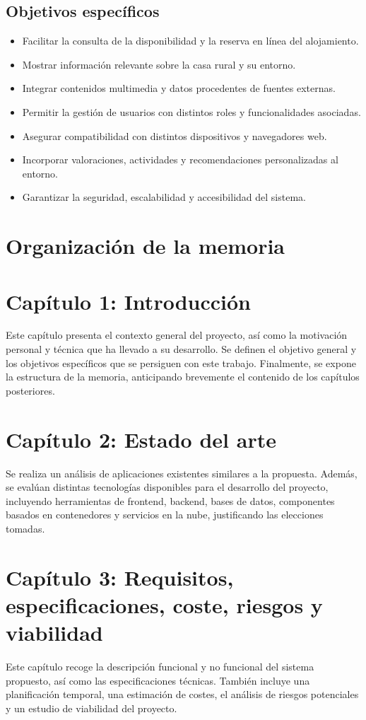 \subsection{Objetivos específicos}
\begin{itemize}
    \item Facilitar la consulta de la disponibilidad y la reserva en línea del alojamiento.
    \item Mostrar información relevante sobre la casa rural y su entorno.
    \item Integrar contenidos multimedia y datos procedentes de fuentes externas.
    \item Permitir la gestión de usuarios con distintos roles y funcionalidades asociadas.
    \item Asegurar compatibilidad con distintos dispositivos y navegadores web.
    \item Incorporar valoraciones, actividades y recomendaciones personalizadas al entorno.
    \item Garantizar la seguridad, escalabilidad y accesibilidad del sistema.
\end{itemize}

\section{Organización de la memoria}

\section*{Capítulo 1: Introducción}
Este capítulo presenta el contexto general del proyecto, así como la motivación personal y técnica que ha llevado a su desarrollo. Se definen el objetivo general y los objetivos específicos que se persiguen con este trabajo. Finalmente, se expone la estructura de la memoria, anticipando brevemente el contenido de los capítulos posteriores.

\section*{Capítulo 2: Estado del arte}
Se realiza un análisis de aplicaciones existentes similares a la propuesta. Además, se evalúan distintas tecnologías disponibles para el desarrollo del proyecto, incluyendo herramientas de frontend, backend, bases de datos, componentes basados en contenedores y servicios en la nube, justificando las elecciones tomadas.

\section*{Capítulo 3: Requisitos, especificaciones, coste, riesgos y viabilidad}
Este capítulo recoge la descripción funcional y no funcional del sistema propuesto, así como las especificaciones técnicas. También incluye una planificación temporal, una estimación de costes, el análisis de riesgos potenciales y un estudio de viabilidad del proyecto.

